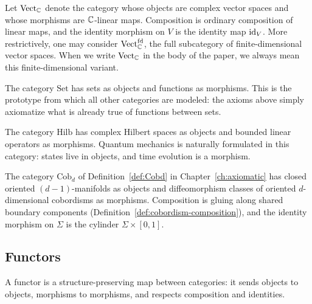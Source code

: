\begin{example}\label{ex:Vect}
Let $\mathrm{Vect}_{\mathbb{C}}$ denote the category whose objects are complex vector spaces and whose morphisms are $\mathbb{C}$-linear maps.  Composition is ordinary composition of linear maps, and the identity morphism on $V$ is the identity map $\operatorname{id}_V$.  More restrictively, one may consider $\mathrm{Vect}_{\mathbb{C}}^{\mathrm{fd}}$, the full subcategory of finite-dimensional vector spaces.  When we write $\mathrm{Vect}_{\mathbb{C}}$ in the body of the paper, we always mean this finite-dimensional variant.
\end{example}

\begin{example}\label{ex:Set}
The category $\mathrm{Set}$ has sets as objects and functions as morphisms.  This is the prototype from which all other categories are modeled: the axioms above simply axiomatize what is already true of functions between sets.
\end{example}

\begin{example}\label{ex:Hilb}
The category $\mathrm{Hilb}$ has complex Hilbert spaces as objects and bounded linear operators as morphisms.  Quantum mechanics is naturally formulated in this category: states live in objects, and time evolution is a morphism.
\end{example}

\begin{example}\label{ex:Cobd-app}
The category $\mathrm{Cob}_d$ of Definition~\ref{def:Cobd} in Chapter~\ref{ch:axiomatic} has closed oriented $(d{-}1)$-manifolds as objects and diffeomorphism classes of oriented $d$-dimensional cobordisms as morphisms.  Composition is gluing along shared boundary components (Definition~\ref{def:cobordism-composition}), and the identity morphism on $\Sigma$ is the cylinder $\Sigma \times [0,1]$.
\end{example}

\subsection{Functors}\label{appsec:functors}

A functor is a structure-preserving map between categories: it sends objects to objects, morphisms to morphisms, and respects composition and identities.

